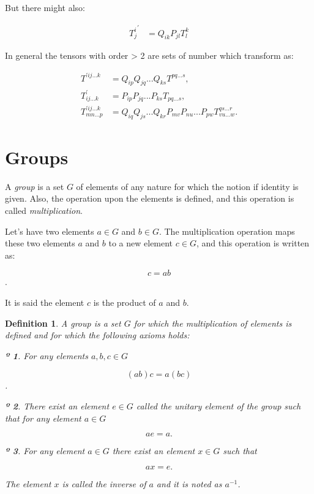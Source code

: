 \documentclass{book}
\newtheorem{definition}{Definition}
\newtheorem{axiom}{º}
\begin{document}
But there might also:

\begin{align}
{T^{i}_{j}}^{'} &= Q_{ik}P_{jl}T^{k}_{l} 
\end{align}

In general the tensors with order > 2 are sets of number which transform as:

\begin{align}
T^{'ij...k} &= Q_{ip}Q_{jq}...Q_{ks}T^{pq...s}, \\
T^{'}_{ij...k} &= P_{ip}P_{jq}...P_{ks}T_{pq...s}, \\
T^{'ij...k}_{mn...p} &= Q_{iq}Q_{js}...Q_{kr}P_{mv}P_{nu}...P_{pw}T^{qs...r}_{vu...w}.
\end{align}

\section{Groups}

A \emph{group} is a set $G$ of elements of any nature for which the notion if identity is given. Also, the operation upon the elements is defined, and this operation is called \emph{multiplication}.

Let's have two elements $a \in G$ and $b \in G$. The multiplication operation maps these two elements $a$ and $b$ to a new element $c \in G$, and this operation is written as:

\[c = ab\].

It is said the element $c$ is the product of $a$ and $b$.

\begin{definition}
A group is a set $G$ for which the multiplication of elements is defined and for which the following axioms holds:

\begin{axiom}
For any elements $a, b, c \in G$ 

\[(ab)c = a(bc)\].
\end{axiom}
\begin{axiom}
There exist an element $e \in G$ called the unitary element of the group such that for any element $a \in G$

\[ae = a.\]
\end{axiom}
\begin{axiom}
For any element $a \in G$ there exist an element $x \in G$ such that

\[ax = e.\]

The element $x$ is called the inverse of $a$ and it is noted as $a^{-1}$.
\end{axiom}
\end{definition}
\end{document}
